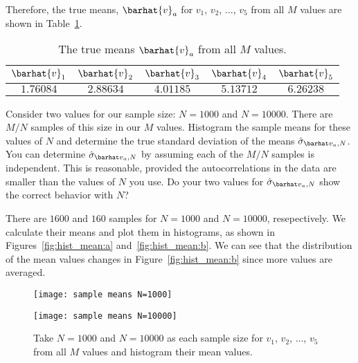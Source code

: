 Therefore, the true means, $\barhat{v}_a$ for $v_1$, $v_2$, $\ldots$, $v_5$ from
all $M$ values are shown in Table~\ref{tab:truemean}.

\begin{table}[H]
    \centering
    \caption{The true means $\barhat{v}_a$ from all $M$ values.}
    \label{tab:truemean}
    \begin{tabular}{@{}ccccc@{}}
        \toprule
        $\barhat{v}_1$ & $\barhat{v}_2$ & $\barhat{v}_3$ & $\barhat{v}_4$ & $\barhat{v}_5$ \\
        \midrule
        $1.76084$      & $2.88634$      & $4.01185$      & $5.13712$      & $6.26238$      \\
        \bottomrule
    \end{tabular}
\end{table}

\Question{} Consider two values for our sample size: $N = 1000$ and $N = 10000$. There are
$M/N$ samples of this size in our $M$ values. Histogram the sample means for these values of
$N$ and determine the true standard deviation of the means $\sgbar{a}$.
You can determine $\sgbar{a}$ by assuming each of the $M/N$ samples is
independent. This is reasonable, provided the autocorrelations in the data are smaller than
the values of $N$ you use. Do your two values for $\sgbar{a}$ show the
correct behavior with $N$?

\Answer{}
There are $1600$ and $160$ samples for $N = 1000$ and $N = 10000$, resepectively.
We calculate their means and plot them in histograms, as shown in
Figures~\ref{fig:hist_mean:a} and~\ref{fig:hist_mean:b}.
We can see that the distribution of the mean values changes in Figure~\ref{fig:hist_mean:b}
since more values are averaged.

\begin{figure}[H]
    \centering
    \begin{minipage}[t]{0.8\linewidth}
        \centering
        \texttt{[image: sample means N=1000]}
        \label{fig:hist_mean:a}
    \end{minipage}
    \hfill
    \begin{minipage}[t]{0.8\linewidth}
        \centering
        \texttt{[image: sample means N=10000]}
        \label{fig:hist_mean:b}
    \end{minipage}
    \caption{Take $N = 1000$ and $N = 10000$ as each sample size
        for $v_1$, $v_2$, $\ldots$, $v_5$ from all $M$ values
        and histogram their mean values.}
    \label{fig:hist_mean}
\end{figure}

